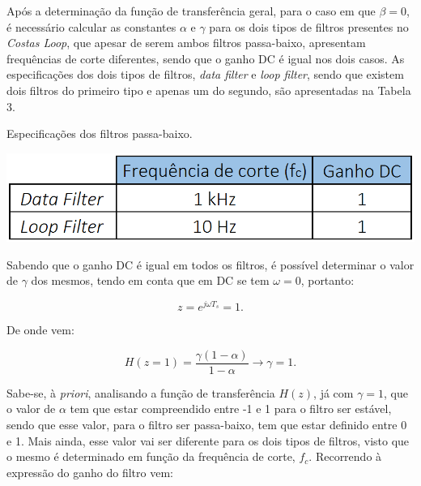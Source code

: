 \documentclass[11pt]{article}
\numberwithin{equation}{section}
\begin{document}
\vspace{1mm}
Após a determinação da função de transferência geral, para o caso em que $\beta = 0$, é necessário calcular as constantes $\alpha$ e $\gamma$ para os dois tipos de filtros presentes no \textit{Costas Loop}, que apesar de serem ambos filtros passa-baixo, apresentam frequências de corte diferentes, sendo que o ganho DC é igual nos dois casos. As especificações dos dois tipos de filtros, \textit{data filter} e \textit{loop filter}, sendo que existem dois filtros do primeiro tipo e apenas um do segundo, são apresentadas na Tabela 3. 

\begin{table}[H]
 	\centering
 	\caption{Especificações dos filtros passa-baixo.}
 	\vspace{-1.5mm}
 	\includegraphics[keepaspectratio=true, scale=0.35]{tabelas/especificacoes}
\end{table}

Sabendo que o ganho DC é igual em todos os filtros, é possível determinar o valor de $\gamma$ dos mesmos, tendo em conta que em DC se tem $\omega = 0$, portanto:

\vspace{-3mm}
\begin{equation}
	z = e^{j \omega T_s} = 1.
\end{equation}

\vspace{1mm}
De onde vem:

\vspace{-3mm}
\begin{equation}
	H(z = 1) = \frac{\gamma(1-\alpha)}{1-\alpha} \longrightarrow \gamma = 1.
\end{equation} 

\vspace{1mm}
Sabe-se, à \textit{priori}, analisando a função de transferência $H(z)$, já com $\gamma = 1$, que o valor de $\alpha$ tem que estar compreendido entre -1 e 1 para o filtro ser estável, sendo que esse valor, para o filtro ser passa-baixo, tem que estar definido entre 0 e 1. Mais ainda, esse valor vai ser diferente para os dois tipos de filtros, visto que o mesmo é determinado em função da frequência de corte, \textit{$f_c$}. Recorrendo à expressão do ganho do filtro vem:
\end{document}
